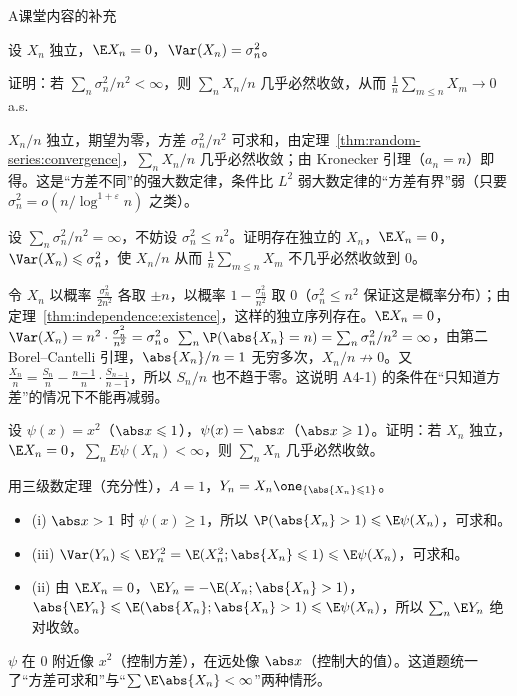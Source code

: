 \begin{exercises}{A}{课堂内容的补充}
\item\label{ex:random-series:A4} 设 $X_n$ 独立，$\E X_n=0$，$\Var(X_n)=\sigma_n^2$。
\begin{questions}
\item 证明：若 $\sum_n\sigma_n^2/n^2<\infty$，则 $\sum_nX_n/n$ 几乎必然收敛，从而 $\frac1n\sum_{m\leqslant n}X_m\to0$ a.s.
\begin{solution}
$X_n/n$ 独立，期望为零，方差 $\sigma_n^2/n^2$ 可求和，由定理~\ref{thm:random-series:convergence}，$\sum_nX_n/n$ 几乎必然收敛；由 Kronecker 引理（$a_n=n$）即得。这是“方差不同”的强大数定律，条件比 $L^2$ 弱大数定律的“方差有界”弱（只要 $\sigma_n^2=o(n/\log^{1+\varepsilon}n)$ 之类）。
\end{solution}
\item 设 $\sum_n\sigma_n^2/n^2=\infty$，不妨设 $\sigma_n^2\leqslant n^2$。证明存在独立的 $X_n$，$\E X_n=0$，$\Var(X_n)\leqslant\sigma_n^2$，使 $X_n/n$ 从而 $\frac1n\sum_{m\leqslant n}X_m$ 不几乎必然收敛到 $0$。
\begin{solution}
令 $X_n$ 以概率 $\frac{\sigma_n^2}{2n^2}$ 各取 $\pm n$，以概率 $1-\frac{\sigma_n^2}{n^2}$ 取 $0$（$\sigma_n^2\leqslant n^2$ 保证这是概率分布）；由定理~\ref{thm:independence:existence}，这样的独立序列存在。$\E X_n=0$，$\Var(X_n)=n^2\cdot\frac{\sigma_n^2}{n^2}=\sigma_n^2$。$\sum_n\P(\abs{X_n}=n)=\sum_n\sigma_n^2/n^2=\infty$，由第二 Borel--Cantelli 引理，$\abs{X_n}/n=1$ 无穷多次，$X_n/n\not\to0$。又 $\frac{X_n}n=\frac{S_n}n-\frac{n-1}n\cdot\frac{S_{n-1}}{n-1}$，所以 $S_n/n$ 也不趋于零。这说明 A4-1) 的条件在“只知道方差”的情况下不能再减弱。
\end{solution}
\end{questions}

\item\label{ex:random-series:A5} 设 $\psi(x)=x^2$（$\abs x\leqslant1$），$\psi(x)=\abs x$（$\abs x\geqslant1$）。证明：若 $X_n$ 独立，$\E X_n=0$，$\sum_nE\psi(X_n)<\infty$，则 $\sum_nX_n$ 几乎必然收敛。
\begin{solution}
用三级数定理（充分性），$A=1$，$Y_n=X_n\one_{\{\abs{X_n}\leqslant1\}}$。
\begin{itemize}
\item (i) $\abs x>1$ 时 $\psi(x)\geqslant1$，所以 $\P(\abs{X_n}>1)\leqslant \E\psi(X_n)$，可求和。
\item (iii) $\Var(Y_n)\leqslant \E Y_n^2=\E(X_n^2;\abs{X_n}\leqslant1)\leqslant \E\psi(X_n)$，可求和。
\item (ii) 由 $\E X_n=0$，$\E Y_n=-\E(X_n;\abs{X_n}>1)$，$\abs{\E Y_n}\leqslant \E(\abs{X_n};\abs{X_n}>1)\leqslant \E\psi(X_n)$，所以 $\sum_n\E Y_n$ 绝对收敛。
\end{itemize}
$\psi$ 在 $0$ 附近像 $x^2$（控制方差），在远处像 $\abs x$（控制大的值）。这道题统一了“方差可求和”与“$\sum \E\abs{X_n}<\infty$”两种情形。
\end{solution}


\end{exercises}
